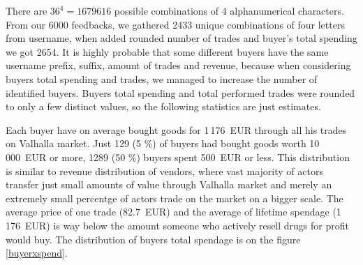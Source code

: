 \documentclass[
  digital, %
  table,   %
  lof,     %
  lot,     %
  oneside
]{fithesis3}
\begin{document}
There are $36^4=1679616$ possible combinations of 4 alphanumerical characters.
From our 6000 feedbacks, we gathered 2433 unique combinations of four letters from username,
when added rounded number of trades and buyer's total spending we got 2654.
It is highly probable that some different buyers have the same username prefix, suffix, amount of 
trades and revenue, because when considering buyers total spending and trades, we managed to increase
the number of identified buyers. Buyers total spending and total performed trades were rounded to only a few distinct values, so the
following statistics are just estimates.

Each buyer have on average bought goods for 1\,176~EUR through all his trades on Valhalla market.
Just 129 (5 \%) of buyers had bought goods worth 10\,000~EUR or more,
 1289 (50 \%) buyers spent 500~EUR or less.
This distribution is similar to revenue distribution of vendors, where
vast majority of actors transfer just small amounts of value through Valhalla market and
merely an extremely small percentge of actors trade on the market on a bigger scale.
The average price of one trade (82.7~EUR) and the average of lifetime spendage (1\,176~EUR)
is way below the amount someone who actively resell drugs for profit would buy.
The distribution of buyers total spendage is on the figure \ref{buyerxspend}.
\end{document}
